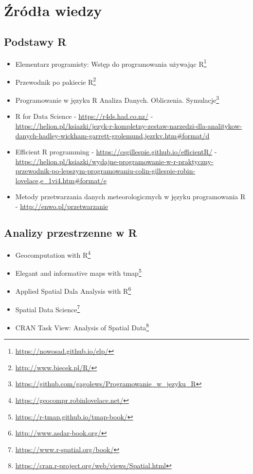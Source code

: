 \documentclass[
  paper=6in:9in,pagesize=pdftex,headinclude=on,footinclude=on,10pt]{scrbook}
\providecommand{\tightlist}{%
  \setlength{\itemsep}{0pt}\setlength{\parskip}{0pt}}
\renewcommand{\href}[2]{#2 (\url{#1})}
\renewcommand{\href}[2]{#2\footnote{\url{#1}}}
\begin{document}
\appendix {}


\chapter{Źródła wiedzy}\label{zrodla-wiedzy}

\section{Podstawy R}\label{podstawy-r}

\begin{itemize}
\tightlist
\item
  \href{https://nowosad.github.io/elp/}{Elementarz programisty: Wstęp do programowania używając R} \citep{nowosadElementarz2020}
\item
  \href{http://www.biecek.pl/R/}{Przewodnik po pakiecie R} \citep{biecekPrzewodnikPoPakiecie2014}
\item
  \href{https://github.com/gagolews/Programowanie_w_jezyku_R}{Programowanie w języku R Analiza Danych. Obliczenia. Symulacje} \citep{gagolewski2016programowanie}
\item
  R for Data Science - \url{https://r4ds.had.co.nz/} - \url{https://helion.pl/ksiazki/jezyk-r-kompletny-zestaw-narzedzi-dla-analitykow-danych-hadley-wickham-garrett-grolemund,jezrkv.htm\#format/d} \citep{wickham2016r}
\item
  Efficient R programming - \url{https://csgillespie.github.io/efficientR/} - \url{https://helion.pl/ksiazki/wydajne-programowanie-w-r-praktyczny-przewodnik-po-lepszym-programowaniu-colin-gillespie-robin-lovelace,e_1vi4.htm\#format/e} \citep{gillespie2016efficient}
\item
  Metody przetwarzania danych meteorologicznych w języku programowania R - \url{http://enwo.pl/przetwarzanie} \citep{czerneckiMetodyPrzetwarzaniaDanych2018}
\end{itemize}

\section{Analizy przestrzenne w R}\label{analizy-przestrzenne-w-r}

\begin{itemize}
\tightlist
\item
  \href{https://geocompr.robinlovelace.net/}{Geocomputation with R} \citep{lovelace2019geocomputation}
\item
  \href{https://r-tmap.github.io/tmap-book/}{Elegant and informative maps with tmap} \citep{tennekes_elegant_2022}
\item
  \href{http://www.asdar-book.org/}{Applied Spatial Dala Analysis with R} \citep{bivand2014applied}
\item
  \href{https://www.r-spatial.org/book/}{Spatial Data Science} \citep{pebesma2020spatial}
\item
  \href{https://cran.r-project.org/web/views/Spatial.html}{CRAN Task View: Analysis of Spatial Data}
\end{itemize}
\end{document}
